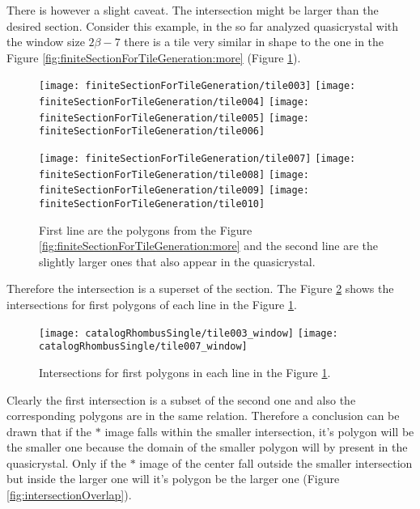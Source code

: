 \documentclass[text.tex]{subfiles}
\begin{document}
There is however a slight caveat. The intersection might be larger than the desired section. Consider this example, in the so far analyzed quasicrystal with the window size $2\beta-7$ there is a tile very similar in shape to the one in the Figure \ref{fig:finiteSectionForTileGeneration:more} (Figure \ref{fig:finiteSectionForTileGeneration:bigger}).
\begin{figure}[h]
\centering
\texttt{[image: finiteSectionForTileGeneration/tile003]}
\texttt{[image: finiteSectionForTileGeneration/tile004]}
\texttt{[image: finiteSectionForTileGeneration/tile005]}
\texttt{[image: finiteSectionForTileGeneration/tile006]}

\texttt{[image: finiteSectionForTileGeneration/tile007]}
\texttt{[image: finiteSectionForTileGeneration/tile008]}
\texttt{[image: finiteSectionForTileGeneration/tile009]}
\texttt{[image: finiteSectionForTileGeneration/tile010]}
\caption{First line are the polygons from the Figure \ref{fig:finiteSectionForTileGeneration:more} and the second line are the slightly larger ones that also appear in the quasicrystal.}
\label{fig:finiteSectionForTileGeneration:bigger}
\end{figure}

Therefore the intersection is a superset of the section. The Figure \ref{fig:intersectionsComparison} shows the intersections for first polygons of each line in the Figure \ref{fig:finiteSectionForTileGeneration:bigger}.

\begin{figure}[h]
\centering
\texttt{[image: catalogRhombusSingle/tile003\_window]}
\texttt{[image: catalogRhombusSingle/tile007\_window]}
\caption{Intersections for first polygons in each line in the Figure \ref{fig:finiteSectionForTileGeneration:bigger}.}
\label{fig:intersectionsComparison}
\end{figure}

Clearly the first intersection is a subset of the second one and also the corresponding polygons are in the same relation. Therefore a conclusion can be drawn that if the $\ast$ image falls within the smaller intersection, it's polygon will be the smaller one because the domain of the smaller polygon will by present in the quasicrystal. Only if the $\ast$ image of the center fall outside the smaller intersection but inside the larger one will it's polygon be the larger one (Figure \ref{fig:intersectionOverlap}).
\end{document}
